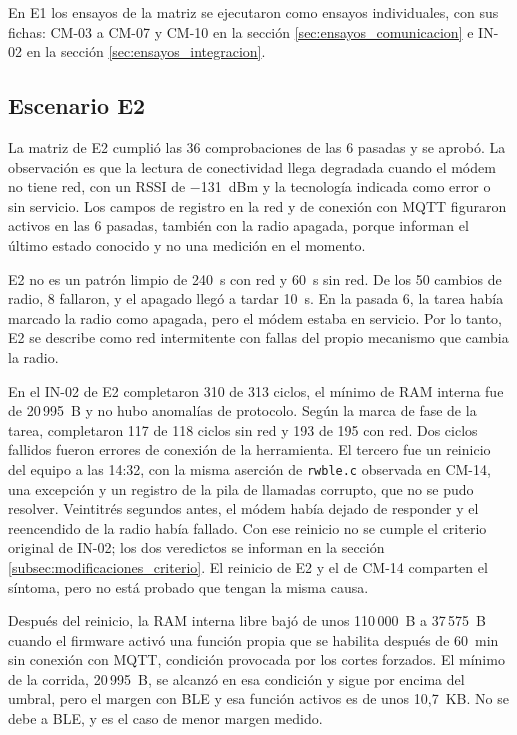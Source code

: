 En E1 los ensayos de la matriz se ejecutaron como ensayos individuales, con sus fichas: CM-03 a CM-07 y CM-10 en la sección \ref{sec:ensayos_comunicacion} e IN-02 en la sección \ref{sec:ensayos_integracion}.

\subsection{Escenario E2}
\label{subsec:escenario_e2}

La matriz de E2 cumplió las 36 comprobaciones de las 6 pasadas y se aprobó. La observación es que la lectura de conectividad llega degradada cuando el módem no tiene red, con un RSSI de $-$131~dBm y la tecnología indicada como error o sin servicio. Los campos de registro en la red y de conexión con MQTT figuraron activos en las 6 pasadas, también con la radio apagada, porque informan el último estado conocido y no una medición en el momento.

E2 no es un patrón limpio de 240~s con red y 60~s sin red. De los 50 cambios de radio, 8 fallaron, y el apagado llegó a tardar 10~s. En la pasada 6, la tarea había marcado la radio como apagada, pero el módem estaba en servicio. Por lo tanto, E2 se describe como red intermitente con fallas del propio mecanismo que cambia la radio.

En el IN-02 de E2 completaron 310 de 313 ciclos, el mínimo de RAM interna fue de 20\,995~B y no hubo anomalías de protocolo. Según la marca de fase de la tarea, completaron 117 de 118 ciclos sin red y 193 de 195 con red. Dos ciclos fallidos fueron errores de conexión de la herramienta. El tercero fue un reinicio del equipo a las 14:32, con la misma aserción de \texttt{rwble.c} observada en CM-14, una excepción y un registro de la pila de llamadas corrupto, que no se pudo resolver. Veintitrés segundos antes, el módem había dejado de responder y el reencendido de la radio había fallado. Con ese reinicio no se cumple el criterio original de IN-02; los dos veredictos se informan en la sección \ref{subsec:modificaciones_criterio}. El reinicio de E2 y el de CM-14 comparten el síntoma, pero no está probado que tengan la misma causa.

Después del reinicio, la RAM interna libre bajó de unos 110\,000~B a 37\,575~B cuando el firmware activó una función propia que se habilita después de 60~min sin conexión con MQTT, condición provocada por los cortes forzados. El mínimo de la corrida, 20\,995~B, se alcanzó en esa condición y sigue por encima del umbral, pero el margen con BLE y esa función activos es de unos 10,7~KB. No se debe a BLE, y es el caso de menor margen medido.


